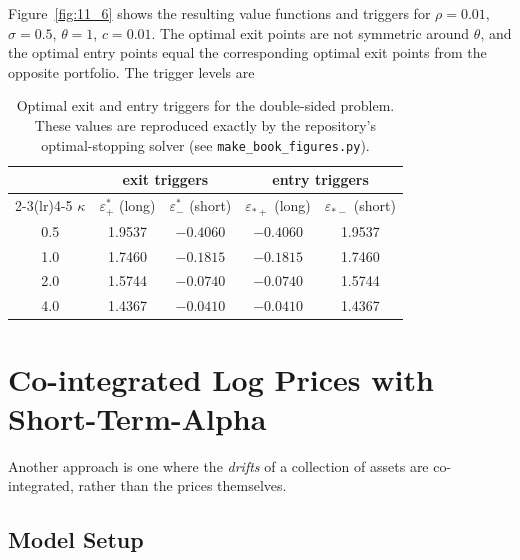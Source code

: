 \documentclass[11pt]{article}
\newcommand{\eps}{\varepsilon}
\begin{document}
Figure~\ref{fig:11_6} shows the resulting value functions and triggers for $\rho=0.01$, $\sigma=0.5$,
$\theta=1$, $c=0.01$. The optimal exit points are not symmetric around $\theta$, and the optimal entry
points equal the corresponding optimal exit points from the opposite portfolio. The trigger levels are

\begin{table}[ht]
  \centering
  \begin{tabular}{ccccc}
    \toprule
    & \multicolumn{2}{c}{exit triggers} & \multicolumn{2}{c}{entry triggers}\\
    \cmidrule(lr){2-3}\cmidrule(lr){4-5}
    $\kappa$ & $\eps^*_+$ (long) & $\eps^*_-$ (short) & $\eps_{*+}$ (long) & $\eps_{*-}$ (short)\\
    \midrule
    0.5 & 1.9537 & $-0.4060$ & $-0.4060$ & 1.9537\\
    1.0 & 1.7460 & $-0.1815$ & $-0.1815$ & 1.7460\\
    2.0 & 1.5744 & $-0.0740$ & $-0.0740$ & 1.5744\\
    4.0 & 1.4367 & $-0.0410$ & $-0.0410$ & 1.4367\\
    \bottomrule
  \end{tabular}
  \caption{Optimal exit and entry triggers for the double-sided problem. These values are reproduced
  exactly by the repository's optimal-stopping solver (see \texttt{make\_book\_figures.py}).}
  \label{tab:triggers}
\end{table}

\section{Co-integrated Log Prices with Short-Term-Alpha}\label{sec:sta}

Another approach is one where the \emph{drifts} of a collection of assets are co-integrated, rather
than the prices themselves.

\subsection{Model Setup}
\end{document}
